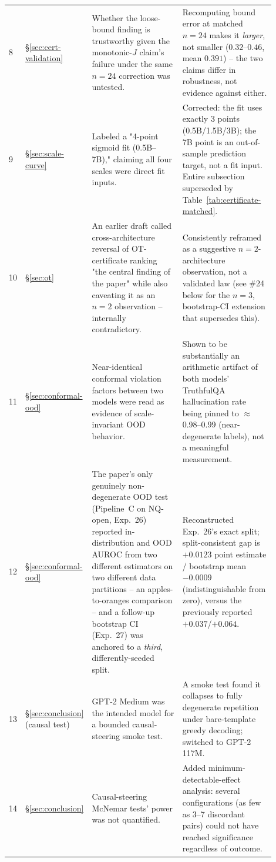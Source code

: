 \documentclass[onecolumn]{jmlr}
\begin{document}
\begin{longtable}{p{0.04\linewidth}p{0.16\linewidth}p{0.35\linewidth}p{0.35\linewidth}}
8 & \S\ref{sec:cert-validation} & Whether the loose-bound finding is trustworthy given the monotonic-$J$ claim's failure under the same $n{=}24$ correction was untested. & Recomputing bound error at matched $n{=}24$ makes it \emph{larger}, not smaller ($0.32$--$0.46$, mean $0.391$) -- the two claims differ in robustness, not evidence against either. \\
9 & \S\ref{sec:scale-curve} & Labeled a "4-point sigmoid fit (0.5B--7B)," claiming all four scales were direct fit inputs. & Corrected: the fit uses exactly 3 points (0.5B/1.5B/3B); the 7B point is an out-of-sample prediction target, not a fit input. Entire subsection superseded by Table~\ref{tab:certificate-matched}. \\
10 & \S\ref{sec:ot} & An earlier draft called cross-architecture reversal of OT-certificate ranking "the central finding of the paper" while also caveating it as an $n{=}2$ observation -- internally contradictory. & Consistently reframed as a suggestive $n{=}2$-architecture observation, not a validated law (see \#24 below for the $n{=}3$, bootstrap-CI extension that supersedes this). \\
11 & \S\ref{sec:conformal-ood} & Near-identical conformal violation factors between two models were read as evidence of scale-invariant OOD behavior. & Shown to be substantially an arithmetic artifact of both models' TruthfulQA hallucination rate being pinned to $\approx$0.98--0.99 (near-degenerate labels), not a meaningful measurement. \\
12 & \S\ref{sec:conformal-ood} & The paper's only genuinely non-degenerate OOD test (Pipeline~C on NQ-open, Exp.~26) reported in-distribution and OOD AUROC from two different estimators on two different data partitions -- an apples-to-oranges comparison -- and a follow-up bootstrap CI (Exp.~27) was anchored to a \emph{third}, differently-seeded split. & Reconstructed Exp.~26's exact split; split-consistent gap is $+0.0123$ point estimate / bootstrap mean $-0.0009$ (indistinguishable from zero), versus the previously reported $+0.037$/$+0.064$. \\
13 & \S\ref{sec:conclusion} (causal test) & GPT-2 Medium was the intended model for a bounded causal-steering smoke test. & A smoke test found it collapses to fully degenerate repetition under bare-template greedy decoding; switched to GPT-2 117M. \\
14 & \S\ref{sec:conclusion} & Causal-steering McNemar tests' power was not quantified. & Added minimum-detectable-effect analysis: several configurations (as few as 3--7 discordant pairs) could not have reached significance regardless of outcome. \\

\end{longtable}
\end{document}
